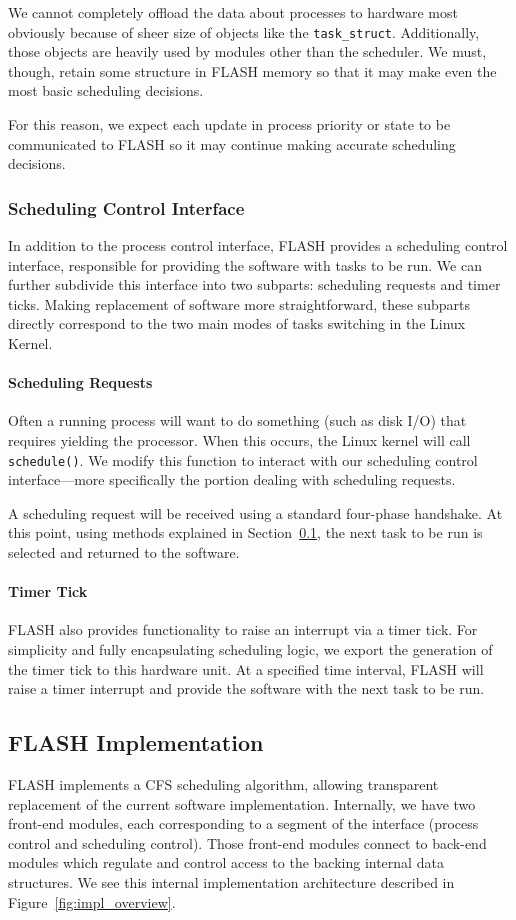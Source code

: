 \documentclass{sig-alternate-10pt}
\newcommand{\ttt}{\texttt}
\begin{document}
We cannot completely offload the data about processes to hardware most
obviously because of sheer size of objects like the \ttt{task\_struct}.
Additionally, those objects are heavily used by modules other than the
scheduler.  We must, though, retain some structure in FLASH memory so that
it may make even the most basic scheduling decisions.

For this reason, we expect each update in process priority or state to be
communicated to FLASH so it may continue making accurate scheduling
decisions.

\subsubsection{Scheduling Control Interface}
In addition to the process control interface, FLASH provides a scheduling
control interface, responsible for providing the software with tasks to be
run.  We can further subdivide this interface into two subparts: scheduling
requests and timer ticks.  Making replacement of software more
straightforward, these subparts directly correspond to the two main modes of
tasks switching in the Linux Kernel.

\paragraph{Scheduling Requests}
Often a running process will want to do something (such as disk I/O) that
requires yielding the processor.  When this occurs, the Linux kernel will
call \texttt{schedule()}.  We modify this function to interact with our
scheduling control interface---more specifically the portion dealing with
scheduling requests.

A scheduling request will be received using a standard four-phase handshake.
At this point, using methods explained in Section~\ref{sec:FLASH_impl}, the
next task to be run is selected and returned to the software.

\paragraph{Timer Tick}
FLASH also provides functionality to raise an interrupt via a timer tick.
For simplicity and fully encapsulating scheduling logic, we export the
generation of the timer tick to this hardware unit.  At a specified time
interval, FLASH will raise a timer interrupt and provide the software with
the next task to be run.

\subsection{FLASH Implementation}
\label{sec:FLASH_impl}
FLASH implements a CFS scheduling algorithm, allowing transparent
replacement of the current software implementation.  Internally, we have two
front-end modules, each corresponding to a segment of the interface (process
control and scheduling control). Those front-end modules connect to back-end
modules which regulate and control access to the backing internal data
structures.  We see this internal implementation architecture described in
Figure~\ref{fig:impl_overview}.
\end{document}
